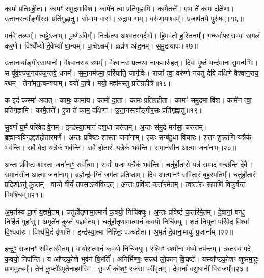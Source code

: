 कामः॑ प्रतिग्रही॒ता। 
कामꣳ॑ समु॒द्रमावि॑श। 
कामे॑न त्वा॒ प्रति॑गृह्णामि। 
कामै॒तत्ते᳚। 
ए॒षा ते॑ काम॒ दक्षि॑णा। 
उ॒त्ता॒नस्त्वा᳚ङ्गीर॒सः प्रति॑गृह्णातु। 
सोमा॑य॒ वासः॑। 
रु॒द्राय॒ गाम्। 
वरु॑णा॒याश्वम्᳚। 
प्र॒जाप॑तये॒ पुरु॑षम्॥१६॥%

मन॑वे॒ तल्पम्᳚। 
त्वष्ट्रे॒ऽजाम्। 
पू॒ष्णेऽविम्᳚। 
निर्\mbox{}ऋ॑त्या अश्वतरगर्द॒भौ। 
हि॒मव॑तो ह॒स्तिनम्᳚। 
ग॒न्ध॒र्वा॒फ्स॒राभ्यः॑ स्रगलं कर॒णे। 
विश्वे᳚भ्यो दे॒वेभ्यो॑ धा॒न्यम्। 
वा॒चेऽन्नम्᳚। 
ब्रह्म॑ण ओद॒नम्। 
स॒मु॒द्रायापः॑॥१७॥

उ॒त्ता॒नाया᳚ङ्गीर॒सायानः॑। 
वै॒श्वा॒न॒राय॒ रथम्᳚। 
वै॒श्वा॒न॒रः प्र॒त्नथा॒ नाक॒मारु॑हत्। 
दि॒वः पृ॒ष्ठं भन्द॑मानः सु॒मन्म॑भिः। 
स पू᳚र्व॒वज्ज॒नय॑ज्ज॒न्तवे॒ धनम्᳚। 
स॒मा॒नम॑ज्मा॒ परि॑याति॒ जागृ॑विः। 
राजा᳚ त्वा॒ वरु॑णो नयतु देवि दक्षिणे वैश्वान॒राय॒ रथम्᳚। 
तेना॑मृत॒त्वम॑श्याम्। 
वयो॑ दा॒त्रे। 
मयो॒ मह्य॑मस्तु प्रतिग्रही॒त्रे॥१८॥

क इ॒दं कस्मा॑ अदात्। 
कामः॒ कामा॑य। 
कामो॑ दा॒ता। 
कामः॑ प्रतिग्रही॒ता। 
कामꣳ॑ समु॒द्रमा वि॑श। 
कामे॑न त्वा॒ प्रति॑गृह्णामि। 
कामै॒तत्ते᳚। 
ए॒षा ते॑ काम॒ दक्षि॑णा। 
उ॒त्ता॒नस्त्वा᳚ङ्गीर॒सः प्रति॑गृह्णातु॥१९॥
\anuvakamend[दा॒ता पुरु॑ष॒मपः॑ प्रतिग्रही॒त्रे नव॑ च]

सु॒वर्णं॑ घ॒र्मं परि॑वेद वे॒नम्। 
इन्द्र॑स्या॒त्मानं॑ दश॒धा चर॑न्तम्। 
अ॒न्तः स॑मु॒द्रे मन॑सा॒ चर॑न्तम्। 
ब्रह्मान्व॑विन्द॒द्दश॑होतार॒मर्णे᳚। 
अ॒न्तः प्रवि॑ष्टः  शा॒स्ता जना॑नाम्। 
एकः॒ सन्ब॑हु॒धा वि॑चारः। 
श॒तꣳ शु॒क्राणि॒ यत्रैकं॒ भव॑न्ति। 
सर्वे॒ वेदा॒ यत्रैकं॒ भव॑न्ति। 
सर्वे॒ होता॑रो॒ यत्रैकं॒ भव॑न्ति। 
स॒मान॑सीन आ॒त्मा जना॑नाम्॥२०॥%

अ॒न्तः प्रवि॑ष्टः  शा॒स्ता जना॑ना॒ꣳ॒ सर्वा᳚त्मा। 
सर्वाः᳚ प्र॒जा यत्रैकं॒ भव॑न्ति। 
चतु॑र्\mbox{}होतारो॒ यत्र॑ स॒म्पदं॒ गच्छ॑न्ति दे॒वैः। 
स॒मान॑सीन आ॒त्मा जना॑नाम्। 
ब्रह्मेन्द्र॑म॒ग्निं जग॑तः प्रति॒ष्ठाम्। 
दि॒व आ॒त्मानꣳ॑ सवि॒तारं॒ बृह॒स्पतिम्᳚। 
चतु॑र्\mbox{}होतारं प्र॒दिशोऽनु॑ कॢ॒प्तम्। 
वा॒चो वी॒र्यं॑ तप॒साऽन्व॑विन्दत्। 
अ॒न्तः प्रवि॑ष्टं क॒र्तार॑मे॒तम्। 
त्वष्टा॑रꣳ रू॒पाणि॑ विकु॒र्वन्तं॑ विप॒श्चिम्॥२१॥

अ॒मृत॑स्य प्रा॒णं य॒ज्ञमे॒तम्। 
चतु॑र्\mbox{}होतृणामा॒त्मानं॑ क॒वयो॒ निचि॑क्युः। 
अ॒न्तः प्रवि॑ष्टं क॒र्तार॑मे॒तम्। 
दे॒वानां॒ बन्धु॒ निहि॑तं॒ गुहा॑सु। 
अ॒मृते॑न कॢ॒प्तं य॒ज्ञमे॒तम्। 
चतु॑र्\mbox{}होतृणामा॒त्मानं॑ क॒वयो॒ निचि॑क्युः। 
श॒तं नि॒युतः॒ परि॑वेद॒ विश्वा॑ वि॒श्ववा॑रः। 
विश्व॑मि॒दं वृ॑णाति। 
इन्द्र॑स्या॒त्मा निहि॑तः॒ पञ्च॑होता। 
अ॒मृतं॑ दे॒वाना॒मायुः॑ प्र॒जाना᳚म्॥२२॥%

इन्द्र॒ꣳ॒ राजा॑नꣳ सवि॒तार॑मे॒तम्। 
वा॒योरा॒त्मानं॑ क॒वयो॒ निचि॑क्युः। 
र॒श्मिꣳ र॑श्मी॒नां मध्ये॒ तप॑न्तम्। 
ऋ॒तस्य॑ प॒दे क॒वयो॒ निपा᳚न्ति। 
य आ᳚ण्डको॒शे भुव॑नं बि॒भर्ति॑। 
अनि॑र्भिण्णः॒ सन्नथ॑ लो॒कान् वि॒चष्टे᳚। 
यस्या᳚ण्डको॒शꣳ शुष्म॑मा॒हुः प्रा॒णमुल्बम्᳚। 
तेन॑ कॢ॒प्तो॑ऽमृते॑ना॒हम॑स्मि। 
सु॒वर्णं॒ कोश॒ꣳ॒ रज॑सा॒ परी॑वृतम्। 
दे॒वानां᳚ वसु॒धानीं᳚  वि॒राजम्᳚॥२३॥%

